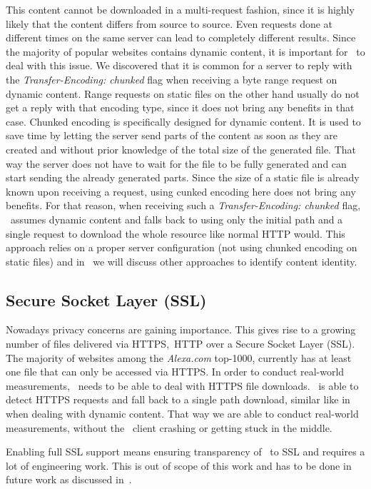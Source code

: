 This content cannot be downloaded in a multi-request fashion, since it is highly likely that the content differs from source to source. 
Even requests done at different times on the same server can lead to completely different results. 
Since the majority of popular websites contains dynamic content, it is important for \mhttp~to deal with this issue. 
We discovered that it is common for a server to reply with the \emph{Transfer-Encoding: chunked} flag when receiving a byte range request on dynamic content. 
Range requests on static files on the other hand usually do not get a reply with that encoding type, since it does not bring any benefits in that case. 
Chunked encoding is specifically designed for dynamic content. 
It is used to save time by letting the server send parts of the content as soon as they are created and without prior knowledge of the total size of the generated file. 
That way the server does not have to wait for the file to be fully generated and can start sending the already generated parts.
Since the size of a static file is already known upon receiving a request, using cunked encoding here does not bring any benefits. 
For that reason, when receiving such a \emph{Transfer-Encoding: chunked} flag, \mhttp~assumes dynamic content and falls back to using only the initial path and a single request to download the whole resource like normal HTTP would. 
This approach relies on a proper server configuration (\eg not using chunked encoding on static files) and in~ we will discuss other approaches to identify content identity. 

\subsection{Secure Socket Layer (SSL)}
\label{sec:ssl}

Nowadays privacy concerns are gaining importance. 
This gives rise to a growing number of files delivered via HTTPS,~\ie HTTP over a Secure Socket Layer (SSL). 
The majority of websites among the \emph{Alexa.com} top-1000, currently has at least one file that can only be accessed via HTTPS. 
In order to conduct real-world measurements, \protonew~needs to be able to deal with HTTPS file downloads. 
\protonew~is able to detect HTTPS requests and fall back to a single path download, similar like in~ when dealing with dynamic content. 
That way we are able to conduct real-world measurements, without the \mhttp~client crashing or getting stuck in the middle. 

Enabling full SSL support means ensuring transparency of \mhttp~to SSL and requires a lot of engineering work. 
This is out of scope of this work and has to be done in future work as discussed in~. 
